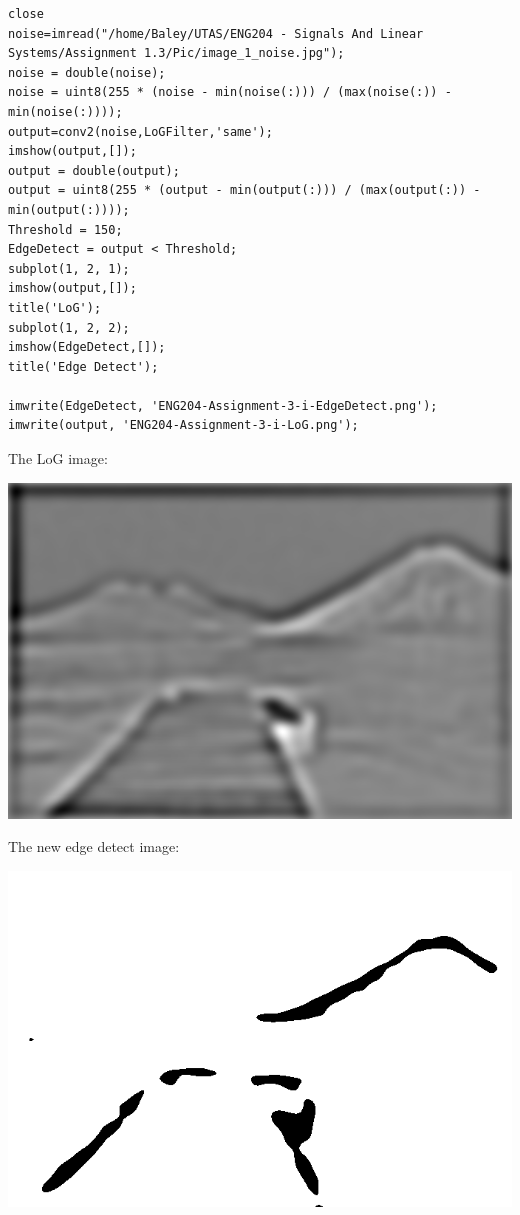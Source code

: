 \documentclass[11pt]{article}
\begin{document}
\begin{verbatim}
close
noise=imread("/home/Baley/UTAS/ENG204 - Signals And Linear Systems/Assignment 1.3/Pic/image_1_noise.jpg");
noise = double(noise);
noise = uint8(255 * (noise - min(noise(:))) / (max(noise(:)) - min(noise(:))));
output=conv2(noise,LoGFilter,'same');
imshow(output,[]);
output = double(output);
output = uint8(255 * (output - min(output(:))) / (max(output(:)) - min(output(:))));
Threshold = 150;
EdgeDetect = output < Threshold;
subplot(1, 2, 1);
imshow(output,[]);
title('LoG');
subplot(1, 2, 2);
imshow(EdgeDetect,[]);
title('Edge Detect');

imwrite(EdgeDetect, 'ENG204-Assignment-3-i-EdgeDetect.png');
imwrite(output, 'ENG204-Assignment-3-i-LoG.png');
\end{verbatim}
The LoG image:
\begin{center}
\includegraphics[width=.9\linewidth]{ENG204-Assignment-3-i-LoG.png}
\end{center}
The new edge detect image:
\begin{center}
\includegraphics[width=.9\linewidth]{ENG204-Assignment-3-i-EdgeDetect.png}
\end{center}
\end{document}
